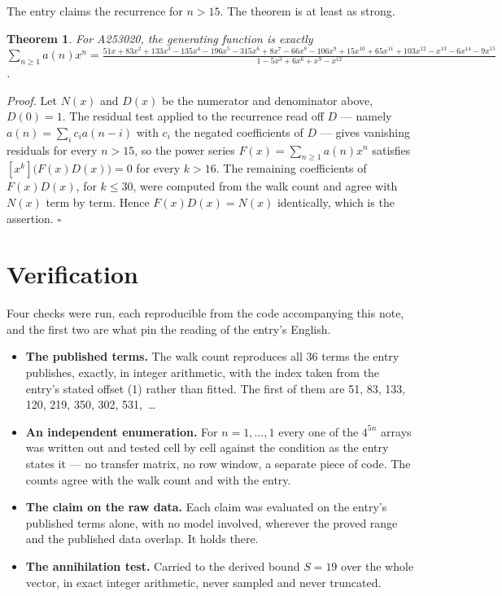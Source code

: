 \documentclass[11pt]{article}
\newtheorem{theorem}{Theorem}
\theoremstyle{definition}
\begin{document}
The entry claims the recurrence for $n > 15$. The theorem is at least as strong.

\begin{theorem} For A253020, the generating function is exactly $\sum_{n\ge 1} a(n)x^n = \frac{51x + 83x^{2} + 133x^{3} - 135x^{4} - 196x^{5} - 315x^{6} + 8x^{7} - 66x^{8} - 106x^{9} + 15x^{10} + 65x^{11} + 103x^{12} - x^{13} - 6x^{14} - 9x^{15}}{1 - 5x^{3} + 6x^{6} + x^{9} - x^{12}}$.\end{theorem}

{\itshape Proof.} Let $N(x)$ and $D(x)$ be the numerator and denominator above, $D(0)=1$. The residual test applied to the recurrence read off $D$ --- namely $a(n) = \sum_i c_i a(n-i)$ with $c_i$ the negated coefficients of $D$ --- gives vanishing residuals for every $n > 15$, so the power series $F(x)=\sum_{n\ge 1}a(n)x^n$ satisfies $[x^k]\bigl(F(x)D(x)\bigr) = 0$ for every $k > 16$. The remaining coefficients of $F(x)D(x)$, for $k \le 30$, were computed from the walk count and agree with $N(x)$ term by term. Hence $F(x)D(x) = N(x)$ identically, which is the assertion. $\square$

\section{Verification}

Four checks were run, each reproducible from the code accompanying this note, and the first two are what pin the reading of the entry's English.

\begin{itemize}

\item {\bfseries The published terms.} The walk count reproduces all 36 terms the entry publishes, exactly, in integer arithmetic, with the index taken from the entry's stated offset (1) rather than fitted. The first of them are 51, 83, 133, 120, 219, 350, 302, 531,~\dots

\item {\bfseries An independent enumeration.} For $n = 1,\dots,1$ every one of the $4^{5n}$ arrays was written out and tested cell by cell against the condition as the entry states it --- no transfer matrix, no row window, a separate piece of code. The counts agree with the walk count and with the entry.

\item {\bfseries The claim on the raw data.} Each claim was evaluated on the entry's published terms alone, with no model involved, wherever the proved range and the published data overlap. It holds there.

\item {\bfseries The annihilation test.} Carried to the derived bound $S = 19$ over the whole vector, in exact integer arithmetic, never sampled and never truncated.

\end{itemize}
\end{document}
